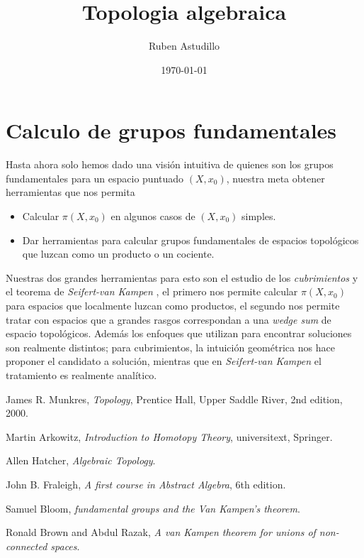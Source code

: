 \documentclass[letterpaper]{article}
\newcommand{\vank}{\emph{Seifert-van Kampen} }
\theoremstyle{definition}
\theoremstyle{plain}
\theoremstyle{plain}
\theoremstyle{plain}
\theoremstyle{remark}
\theoremstyle{remark}
\begin{document}
\title{Topologia algebraica}
\author{Ruben Astudillo}
\date{\today}
\maketitle


\tableofcontents



\section{Calculo de grupos fundamentales}
Hasta ahora solo hemos dado una visión intuitiva de quienes son los
grupos fundamentales para un espacio puntuado \((X,x_0)\), nuestra meta
obtener herramientas que nos permita
\begin{itemize}
\item Calcular \(\pi (X, x_0)\) en algunos casos de \((X,x_0)\) simples.
\item Dar herramientas para calcular grupos fundamentales de espacios
  topológicos que luzcan como un producto o un cociente.
\end{itemize}
Nuestras dos grandes herramientas para esto son el estudio de los
\emph{cubrimientos} y el teorema de \vank , el primero nos permite
calcular \(\pi (X, x_0)\) para espacios que localmente luzcan como
productos, el segundo nos permite tratar con espacios que a grandes
rasgos correspondan a una \emph{wedge sum} de espacio topológicos.
Además los enfoques que utilizan para encontrar soluciones son realmente
distintos; para cubrimientos, la intuición geométrica nos hace
proponer el candidato a solución, mientras que en \vank el tratamiento
es realmente analítico.




\begin{thebibliography}{9}

  James R. Munkres,
  \emph{Topology},
  Prentice Hall, Upper Saddle River,
  2nd edition,
  2000.

  Martin Arkowitz,
  \emph{Introduction to Homotopy Theory},
  universitext, Springer.

  Allen Hatcher,
  \emph{Algebraic Topology}.

  John B. Fraleigh,
  \emph{A first course in Abstract Algebra},
  6th edition.

  Samuel Bloom,
  \emph{fundamental  groups  and  the  Van  Kampen’s theorem}.

  Ronald Brown and Abdul Razak,
  \emph{A van Kampen theorem for unions of non-connected spaces}.
\end{thebibliography}
\end{document}
